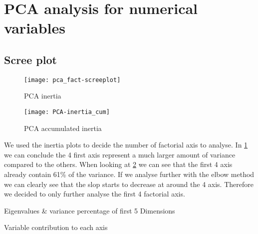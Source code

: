 

\section{PCA analysis for numerical variables}%
\label{sec:pca_analysis_for_numerical_variables}

\subsection{Scree plot}%
\label{sub:scree_plot}


\begin{figure}[H]
    \centering
    \texttt{[image: pca\_fact-screeplot]} %
    \caption{PCA inertia}%
    \label{fig:pca_inertia}
\end{figure}

\begin{figure}[H]
    \centering
    \texttt{[image: PCA-inertia\_cum]}
    \caption{PCA accumulated inertia}%
    \label{fig:pca_inertia_cum}
\end{figure}

\vspace{-1em}
We used the inertia plots to decide the number of factorial axis to analyse. In
\cref{fig:pca_inertia} we can conclude the 4 first axis represent a much
larger amount of variance compared to the others. When looking at
\cref{fig:pca_inertia_cum} we can see that the first 4 axis already contain 61\%
of the variance. If we analyse further with the elbow method we can clearly see
that the slop starts to decrease at around the 4 axis. Therefore we decided to
only further analyse the first 4 factorial axis.


\begin{table}[H]
    \centering
    \caption{Eigenvalues \& variance percentage of first 5 Dimensions}%
    \label{tab:eig}
    
\end{table}

\begin{table}[H]
    \centering
    \caption{Variable contribution to each axis}%
    \label{tab:}
    
\end{table}

